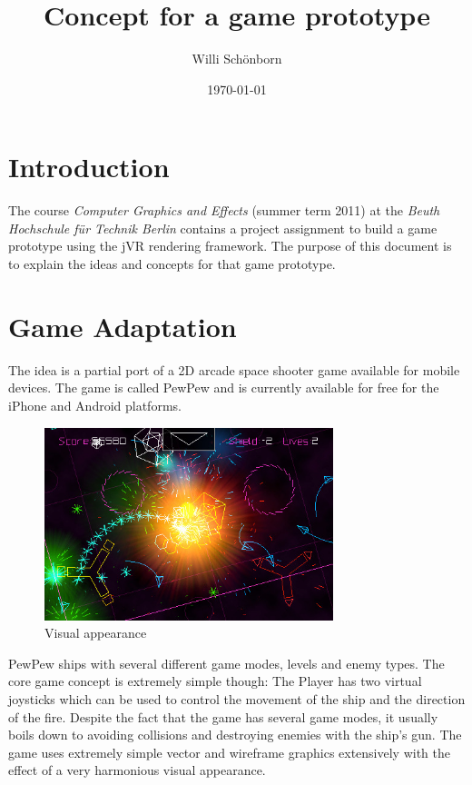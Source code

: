 \documentclass[a4paper]{article}
\title{Concept for a game prototype}
\author{Willi Schönborn}
\date{\today}
\begin{document}
\maketitle

\section*{Introduction}
The course \textit{Computer Graphics and Effects} (summer term 2011) at the \textit{Beuth Hochschule für Technik Berlin} contains a project assignment to build a game prototype using the jVR rendering framework. The purpose of this document is to explain the ideas and concepts for that game prototype.

\section*{Game Adaptation}
The idea is a partial port of a 2D arcade space shooter game available for mobile devices. The game is called PewPew and is currently available for free for the iPhone and Android platforms.

\begin{figure}[htbp]
\centering
\includegraphics[width=0.75\textwidth]{PewPew-iPhone-App-Review.jpg}
\caption{Visual appearance}
\end{figure}

PewPew ships with several different game modes, levels and enemy types. The core game concept is extremely simple though: The Player has two virtual joysticks which can be used to control the movement of the ship and the direction of the fire. Despite the fact that the game has several game modes, it usually boils down to avoiding collisions and destroying enemies with the ship's gun. The game uses extremely simple vector and wireframe graphics extensively with the effect of a very harmonious visual appearance.
\end{document}
